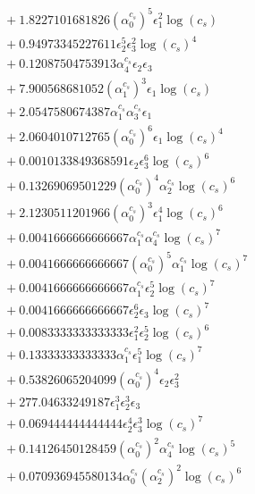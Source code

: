 \documentclass[10pt]{article}
\begin{document}
\begin{align*}
&{}  + 1.8227101681826 \left(\alpha_{0}^{c_s}\right)^{5} \epsilon_{1}^{2} \log{\left(c_{s} \right)} \\
&{}  + 0.94973345227611 \epsilon_{2}^{5} \epsilon_{3}^{2} \log{\left(c_{s} \right)}^{4} \\
&{}  + 0.12087504753913 \alpha_{4}^{c_s} \epsilon_{2} \epsilon_{3} \\
&{}  + 7.900568681052 \left(\alpha_{1}^{c_s}\right)^{3} \epsilon_{1} \log{\left(c_{s} \right)} \\
&{}  + 2.0547580674387 \alpha_{1}^{c_s} \alpha_{3}^{c_s} \epsilon_{1} \\
&{}  + 2.0604010712765 \left(\alpha_{0}^{c_s}\right)^{6} \epsilon_{1} \log{\left(c_{s} \right)}^{4} \\
&{}  + 0.0010133849368591 \epsilon_{2} \epsilon_{3}^{6} \log{\left(c_{s} \right)}^{6} \\
&{}  + 0.13269069501229 \left(\alpha_{0}^{c_s}\right)^{4} \alpha_{2}^{c_s} \log{\left(c_{s} \right)}^{6} \\
&{}  + 2.1230511201966 \left(\alpha_{0}^{c_s}\right)^{3} \epsilon_{1}^{4} \log{\left(c_{s} \right)}^{6} \\
&{}  + 0.0041666666666667 \alpha_{1}^{c_s} \alpha_{4}^{c_s} \log{\left(c_{s} \right)}^{7} \\
&{}  + 0.0041666666666667 \left(\alpha_{0}^{c_s}\right)^{5} \alpha_{1}^{c_s} \log{\left(c_{s} \right)}^{7} \\
&{}  + 0.0041666666666667 \alpha_{1}^{c_s} \epsilon_{2}^{5} \log{\left(c_{s} \right)}^{7} \\
&{}  + 0.0041666666666667 \epsilon_{2}^{6} \epsilon_{3} \log{\left(c_{s} \right)}^{7} \\
&{}  + 0.0083333333333333 \epsilon_{1}^{2} \epsilon_{2}^{5} \log{\left(c_{s} \right)}^{6} \\
&{}  + 0.13333333333333 \alpha_{1}^{c_s} \epsilon_{1}^{5} \log{\left(c_{s} \right)}^{7} \\
&{}  + 0.53826065204099 \left(\alpha_{0}^{c_s}\right)^{4} \epsilon_{2} \epsilon_{3}^{2} \\
&{}  + 277.04633249187 \epsilon_{1}^{3} \epsilon_{2}^{3} \epsilon_{3} \\
&{}  + 0.069444444444444 \epsilon_{2}^{4} \epsilon_{3}^{3} \log{\left(c_{s} \right)}^{7} \\
&{}  + 0.14126450128459 \left(\alpha_{0}^{c_s}\right)^{2} \alpha_{4}^{c_s} \log{\left(c_{s} \right)}^{5} \\
&{}  + 0.070936945580134 \alpha_{0}^{c_s} \left(\alpha_{2}^{c_s}\right)^{2} \log{\left(c_{s} \right)}^{6} \\

\end{align*}
\end{document}
